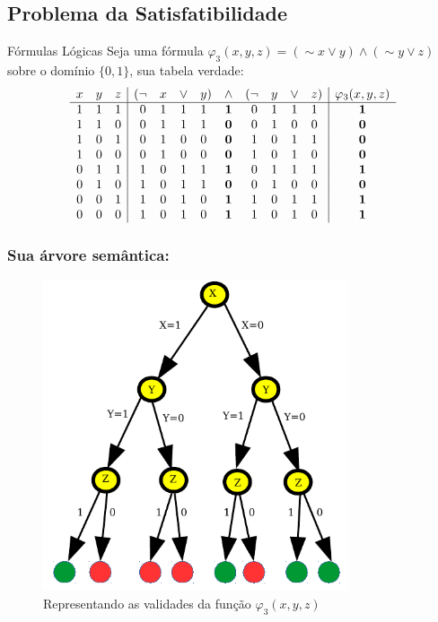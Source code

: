 \documentclass{beamer}
\begin{document}
\subsection{Problema da Satisfatibilidade}
\begin{frame}[fragile]

\begin{block}{Fórmulas Lógicas}
Seja uma fórmula $\varphi_3 (x,y,z) = (\sim x \vee y)\wedge (\sim y \vee z)$  sobre  o domínio $\{0 , 1\}$, sua  tabela verdade:
$$
\begin{array}{ccc|c@{}cccc@{}ccc@{}cccc@{}c  | c }
x&y&z&(&\lnot&x&\lor&y&)&\land&(&\lnot&y&\lor&z&) & \varphi_3 (x,y,z) \\\hline
1&1&1&&0&1&1&1&&\mathbf{1}&&0&1&1&1& & \mathbf{1}\\
1&1&0&&0&1&1&1&&\mathbf{0}&&0&1&0&0& & \mathbf{0}\\
1&0&1&&0&1&0&0&&\mathbf{0}&&1&0&1&1& & \mathbf{0}\\
1&0&0&&0&1&0&0&&\mathbf{0}&&1&0&1&0& & \mathbf{0}\\
0&1&1&&1&0&1&1&&\mathbf{1}&&0&1&1&1& & \mathbf{1}\\
0&1&0&&1&0&1&1&&\mathbf{0}&&0&1&0&0& & \mathbf{0}\\
0&0&1&&1&0&1&0&&\mathbf{1}&&1&0&1&1& & \mathbf{1}\\
0&0&0&&1&0&1&0&&\mathbf{1}&&1&0&1&0& & \mathbf{1}
\end{array}
$$


\end{block}
\end{frame}

\begin{frame}[fragile]
\frametitle{Sua árvore semântica:}

\begin{figure}[ht!]
 \centering
 \includegraphics[width=0.8\textwidth , height=0.65\textheight]{figures/xyz_tree.pdf}
 \caption{Representando as validades da função $\varphi_3 (x,y,z)$} 
\end{figure}

\end{frame}
\end{document}
